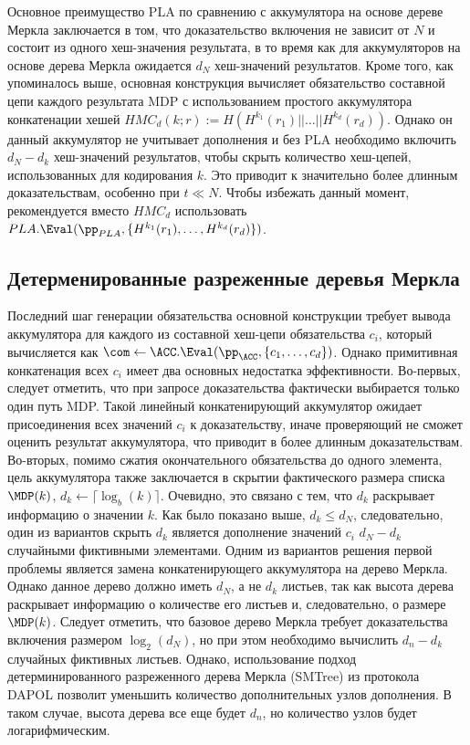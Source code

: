 Основное преимущество PLA по сравнению с аккумулятора на основе дереве Меркла заключается в том, что доказательство включения не зависит от $N$ и состоит из одного хеш-значения результата, в то время как для аккумуляторов на основе дерева Меркла ожидается $d_N$ хеш-значений результатов.
Кроме того, как упоминалось выше, основная конструкция вычисляет обязательство составной цепи каждого результата MDP с использованием простого аккумулятора конкатенации хешей $HMC_d(k; r) := H(H^{k_1}(r_1) || \dots || H^{k_d}(r_d))$.
Однако он данный аккумулятор не учитывает дополнения и без PLA необходимо включить $d_N - d_k$ хеш-значений результатов, чтобы скрыть количество хеш-цепей, использованных для кодирования $k$.
Это приводит к значительно более длинным доказательствам, особенно при $t \ll N$.
Чтобы избежать данный момент, рекомендуется вместо $HMC_d$ использовать $PLA.\Eval(\pp_{PLA}, \{H^{k_1}(r_1), \dots, H^{k_d}(r_d)\})$.

\subsection{Детерменированные разреженные деревья Меркла} %
Последний шаг генерации обязательства основной конструкции требует вывода аккумулятора для каждого из составной хеш-цепи обязательства $c_i$, который вычисляется как  $\com \leftarrow \ACC.\Eval(\pp_\ACC, \{c_1, \dots, c_d\})$.
Однако примитивная конкатенация всех $c_i$ имеет два основных недостатка эффективности.
Во-первых, следует отметить, что при запросе доказательства фактически выбирается только один путь MDP.
Такой линейный конкатенирующий аккумулятор ожидает присоединения всех значений $c_i$ к доказательству, иначе проверяющий не сможет оценить результат аккумулятора, что приводит в более длинным доказательствам.
Во-вторых, помимо сжатия окончательного обязательства до одного элемента, цель аккумулятора также заключается в скрытии фактического размера списка $\MDP(k)$, $d_k \leftarrow \lceil \log_b(k) \rceil$.
Очевидно, это связано с тем, что $d_k$ раскрывает информацию о значении $k$.
Как было показано выше, $d_k \leq d_N$, следовательно, один из вариантов скрыть $d_k$ является дополнение значений $c_i$ $d_N - d_k$ случайными фиктивными элементами.
Одним из вариантов решения первой проблемы является замена конкатенирующего аккумулятора на дерево Меркла.
Однако данное дерево должно иметь $d_N$, а не $d_k$ листьев, так как высота дерева раскрывает информацию о количестве его листьев и, следовательно, о размере $\MDP(k)$.
Следует отметить, что базовое дерево Меркла требует доказательства включения размером $\log_2(d_N)$, но при этом необходимо вычислить $d_n - d_k$ случайных фиктивных листьев.
Однако, использование подход детерминированного разреженного дерева Меркла (SMTree) из протокола DAPOL \cite{cryptoeprint:2020/468} позволит уменьшить количество дополнительных узлов дополнения.
В таком случае, высота дерева все еще будет $d_n$, но количество узлов будет логарифмическим.

